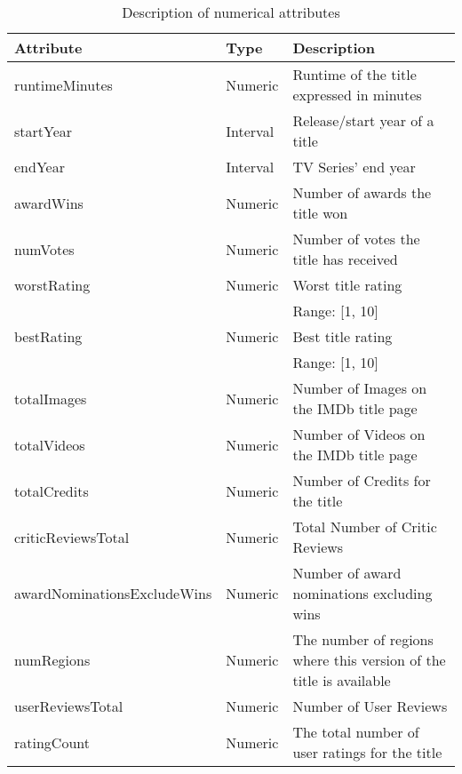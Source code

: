 \begin{table}[h!]
    \centering
    \begin{tabularx}{\textwidth}{|l|l|X|} %
        \hline
        \textbf{Attribute} & \textbf{Type} & \textbf{Description} \\ 
        \hline
        runtimeMinutes & Numeric & Runtime of the title expressed in minutes \\ 
        \hline
        startYear & Interval & Release/start year of a title \\ 
        \hline
        endYear & Interval & TV Series' end year \\
        \hline
        awardWins & Numeric & Number of awards the title won \\ 
        \hline
        numVotes & Numeric & Number of votes the title has received \\ 
        \hline
        worstRating & Numeric & Worst title rating \\
        & & Range: [1, 10] \\
        \hline
        bestRating & Numeric & Best title rating \\ 
        & & Range: [1, 10] \\
        \hline
        totalImages & Numeric & Number of Images on the IMDb title page \\ 
        \hline
        totalVideos & Numeric & Number of Videos on the IMDb title page \\ 
        \hline
        totalCredits & Numeric & Number of Credits for the title \\ 
        \hline
        criticReviewsTotal & Numeric & Total Number of Critic Reviews \\ 
        \hline
        awardNominationsExcludeWins & Numeric & Number of award nominations excluding wins \\ 
        \hline
        numRegions & Numeric & The number of regions where this version of the title is available \\ 
        \hline
        userReviewsTotal & Numeric & Number of User Reviews \\ 
        \hline
        ratingCount & Numeric & The total number of user ratings for the title \\
        \hline
    \end{tabularx}
    \caption{Description of numerical attributes}
    \label{tab:numerical_attributes}
\end{table}


